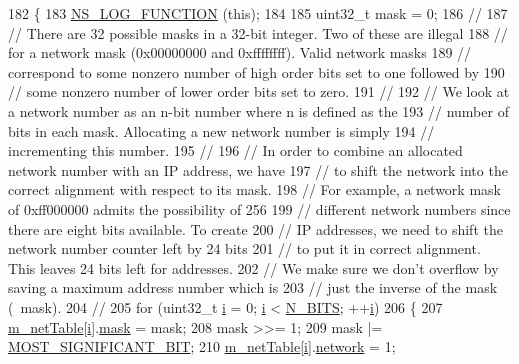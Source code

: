 \begin{DoxyCode}
182 \{
183   \hyperlink{log-macros-disabled_8h_a90b90d5bad1f39cb1b64923ea94c0761}{NS\_LOG\_FUNCTION} (\textcolor{keyword}{this});
184 
185   uint32\_t mask = 0;
186 \textcolor{comment}{//}
187 \textcolor{comment}{// There are 32 possible masks in a 32-bit integer.  Two of these are illegal}
188 \textcolor{comment}{// for a network mask (0x00000000 and 0xffffffff).  Valid network masks}
189 \textcolor{comment}{// correspond to some nonzero number of high order bits set to one followed by }
190 \textcolor{comment}{// some nonzero number of lower order bits set to zero.}
191 \textcolor{comment}{//}
192 \textcolor{comment}{// We look at a network number as an n-bit number where n is defined as the }
193 \textcolor{comment}{// number of bits in each mask.  Allocating a new network number is simply }
194 \textcolor{comment}{// incrementing this number.}
195 \textcolor{comment}{//}
196 \textcolor{comment}{// In order to combine an allocated network number with an IP address, we have}
197 \textcolor{comment}{// to shift the network into the correct alignment with respect to its mask.}
198 \textcolor{comment}{// For example, a network mask of 0xff000000 admits the possibility of 256}
199 \textcolor{comment}{// different network numbers since there are eight bits available.  To create}
200 \textcolor{comment}{// IP addresses, we need to shift the network number counter left by 24 bits}
201 \textcolor{comment}{// to put it in correct alignment.  This leaves 24 bits left for addresses.}
202 \textcolor{comment}{// We make sure we don't overflow by saving a maximum address number which is}
203 \textcolor{comment}{// just the inverse of the mask (~mask).}
204 \textcolor{comment}{//}
205   \textcolor{keywordflow}{for} (uint32\_t \hyperlink{bernuolliDistribution_8m_a6f6ccfcf58b31cb6412107d9d5281426}{i} = 0; \hyperlink{bernuolliDistribution_8m_a6f6ccfcf58b31cb6412107d9d5281426}{i} < \hyperlink{classns3_1_1Ipv4AddressGeneratorImpl_a76a2bff7838831dc3d1027f12e4fac85}{N\_BITS}; ++\hyperlink{bernuolliDistribution_8m_a6f6ccfcf58b31cb6412107d9d5281426}{i})
206     \{
207       \hyperlink{classns3_1_1Ipv4AddressGeneratorImpl_a9cdf3f8008d6e9d7ce32272db4d6dcc9}{m\_netTable}[\hyperlink{bernuolliDistribution_8m_a6f6ccfcf58b31cb6412107d9d5281426}{i}].\hyperlink{classns3_1_1Ipv4AddressGeneratorImpl_1_1NetworkState_af72c61673bc535c22b2dedd6afd21b4d}{mask} = mask;
208       mask >>= 1;
209       mask |= \hyperlink{classns3_1_1Ipv4AddressGeneratorImpl_ad39d68d2d28c578b8c90be437c853c35}{MOST\_SIGNIFICANT\_BIT};
210       \hyperlink{classns3_1_1Ipv4AddressGeneratorImpl_a9cdf3f8008d6e9d7ce32272db4d6dcc9}{m\_netTable}[\hyperlink{bernuolliDistribution_8m_a6f6ccfcf58b31cb6412107d9d5281426}{i}].\hyperlink{classns3_1_1Ipv4AddressGeneratorImpl_1_1NetworkState_afe15739547ef60d7ba74c3ab6b83e6f8}{network} = 1;

\end{DoxyCode}
